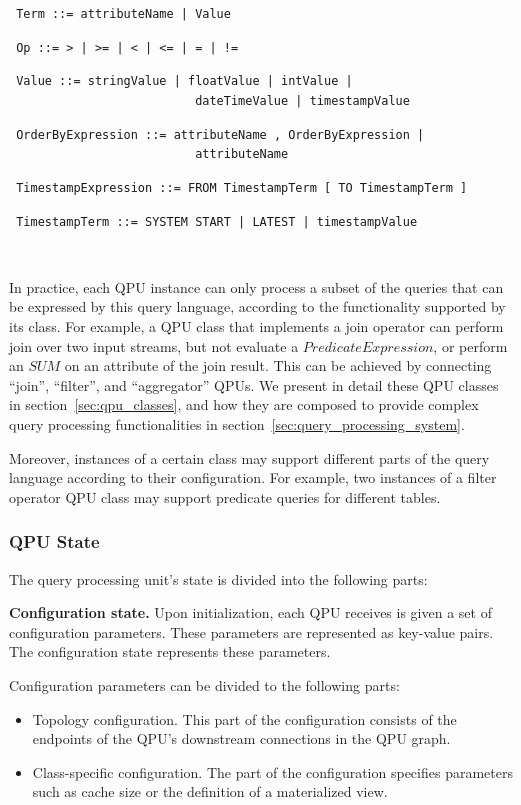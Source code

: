 {\obeylines\obeyspaces
\texttt{
Term                  ::=  attributeName | Value
}}

{\obeylines\obeyspaces
\texttt{
Op                    ::= > | >= | < | <= | = | !=
}}

{\obeylines\obeyspaces
\texttt{
Value                 ::= stringValue | floatValue | intValue |
~~~~~~~~~~~~~~~~~~~~~~~~~~dateTimeValue | timestampValue
}}

{\obeylines\obeyspaces
\texttt{
OrderByExpression     ::= attributeName , OrderByExpression |
~~~~~~~~~~~~~~~~~~~~~~~~~~attributeName
}}

{\obeylines\obeyspaces
\texttt{
TimestampExpression   ::= FROM TimestampTerm [ TO TimestampTerm ]
}}

{\obeylines\obeyspaces
\texttt{
TimestampTerm         ::= SYSTEM START | LATEST | timestampValue
}}

~ \bigskip

In practice, each QPU instance can only process a subset of the queries that can be expressed by this query language,
according to the functionality supported by its class.
For example, a QPU class that implements a join operator can perform join over two input streams,
but not evaluate a $PredicateExpression$, or perform an $SUM$ on an attribute of the join result.
This can be achieved by connecting ``join'', ``filter'', and ``aggregator'' QPUs.
We present in detail these QPU classes in section~\ref{sec:qpu_classes},
and how they are composed to provide complex query processing functionalities in section~\ref{sec:query_processing_system}.

Moreover, instances of a certain class may support different parts of the query language according to their
configuration.
For example, two instances of a filter operator QPU class may support predicate queries for different tables.

\subsubsection{QPU State}

The query processing unit's state is divided into the following parts:

\medskip
\noindent
\textbf{Configuration state.}
Upon initialization, each QPU receives is given a set of configuration parameters.
These parameters are represented as key-value pairs.
The configuration state represents these parameters.

Configuration parameters can be divided to the following parts:
\begin{itemize}
  \item Topology configuration.
  This part of the configuration consists of the endpoints of the QPU's downstream connections in the QPU graph.

  \item Class-specific configuration.
  The part of the configuration specifies parameters such as cache size or the definition of a materialized view.
\end{itemize}

